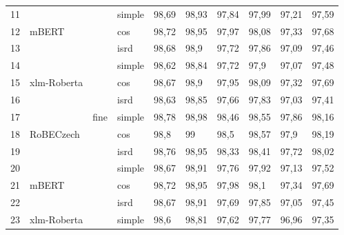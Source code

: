 \begin{table}
{\begin{tabular}{|l|l|l|l||llllll|}
11 & \multirow{3}{*}{mBERT} & \multirow{18}{*}{fine} & simple & 98,69 & 98,93 & 97,84 & 97,99 & 97,21 & 97,59 \\ \cline{1-1} \cline{4-10} 
12 &                              &                         & cos    & 98,72  & 98,95   & 97,97   & 98,08    & 97,33     & 97,68      \\ \cline{1-1} \cline{4-10} 
13 &                              &                         & isrd   & 98,68  & 98,9    & 97,72   & 97,86    & 97,09     & 97,46      \\ \cline{1-2} \cline{4-10} 
14 & \multirow{3}{*}{xlm-Roberta} &                         & simple & 98,62  & 98,84   & 97,72   & 97,9     & 97,07     & 97,48      \\ \cline{1-1} \cline{4-10} 
15 &                              &                         & cos    & 98,67  & 98,9    & 97,95   & 98,09    & 97,32     & 97,69      \\ \cline{1-1} \cline{4-10} 
16 &                              &                         & isrd   & 98,63  & 98,85   & 97,66   & 97,83    & 97,03     & 97,41      \\ \cline{1-2} \cline{4-10} 
17 & \multirow{3}{*}{RoBECzech}   &                         & simple & 98,78  & 98,98   & 98,46   & 98,55    & 97,86     & 98,16      \\ \cline{1-1} \cline{4-10} 
18 &                              &                         & cos    & 98,8   & 99      & 98,5    & 98,57    & 97,9      & 98,19      \\ \cline{1-1} \cline{4-10} 
19 &                              &                         & isrd   & 98,76  & 98,95   & 98,33   & 98,41    & 97,72     & 98,02      \\ \cline{1-2} \cline{4-10} 
20 & \multirow{3}{*}{mBERT}       &                         & simple & 98,67  & 98,91   & 97,76   & 97,92    & 97,13     & 97,52      \\ \cline{1-1} \cline{4-10} 
21 &                              &                         & cos    & 98,72  & 98,95   & 97,98   & 98,1     & 97,34     & 97,69      \\ \cline{1-1} \cline{4-10} 
22 &                              &                         & isrd   & 98,67  & 98,91   & 97,69   & 97,85    & 97,05     & 97,45      \\ \cline{1-2} \cline{4-10} 
23 & \multirow{3}{*}{xlm-Roberta} &                         & simple & 98,6   & 98,81   & 97,62   & 97,77    & 96,96     & 97,35      \\ \cline{1-1} \cline{4-10} 

\end{tabular}}
\end{table}
